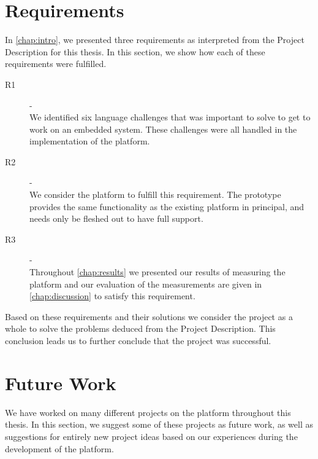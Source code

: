 \section{Requirements}

In \autoref{chap:intro}, we presented three requirements as interpreted from the Project Description for this thesis.
In this section, we show how each of these requirements were fulfilled.

\begin{description}
    \item[R1] - {{\reqi}} \hfill \\
    We identified six language challenges that was important to solve to get {\rust} to work on an embedded system.
    These challenges were all handled in the implementation of the {\rg} platform.

  \item[R2] - {{\reqii}} \hfill \\
    We consider the {\rg} platform to fulfill this requirement.
    The prototype provides the same functionality as the existing {\C} platform in principal, and needs only be fleshed out to have full support.

    \item[R3] - {{\reqiii}} \hfill \\
    Throughout \autoref{chap:results} we presented our results of measuring the {\rg} platform and our evaluation of the measurements are given in \autoref{chap:discussion} to satisfy this requirement.
\end{description}

Based on these requirements and their solutions we consider the project as a whole to solve the problems deduced from the Project Description.
This conclusion leads us to further conclude that the project was successful.

\section{Future Work}
\label{chap:future}

We have worked on many different projects on the {\rg} platform throughout this thesis.
In this section, we suggest some of these projects as future work, as well as suggestions for entirely new project ideas based on our experiences during the development of the {\rg} platform.

